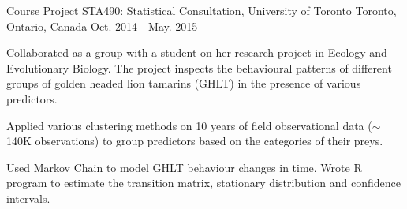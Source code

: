 \begin{cventries}
  \cventry
    {Course Project} %
    {STA490: Statistical Consultation, University of Toronto} %
    {Toronto, Ontario, Canada} %
    {Oct. 2014 - May. 2015} %
    {
      \begin{cvitems} %
        \item {Collaborated as a group with a student on her research project in Ecology and Evolutionary Biology. The project inspects the behavioural patterns of different groups of golden headed lion tamarins (GHLT) in the presence of various predictors.}\\ 
        \begin{cvitems} 
          \item {Applied various clustering methods on 10 years of field observational data ($\sim$140K observations) to group predictors based on the categories of their preys.}
          \item {Used Markov Chain to model GHLT behaviour changes in time. Wrote R program to estimate the transition matrix, stationary distribution and confidence intervals.}\\
        \end{cvitems}
      \end{cvitems}
    }

\end{cventries}
